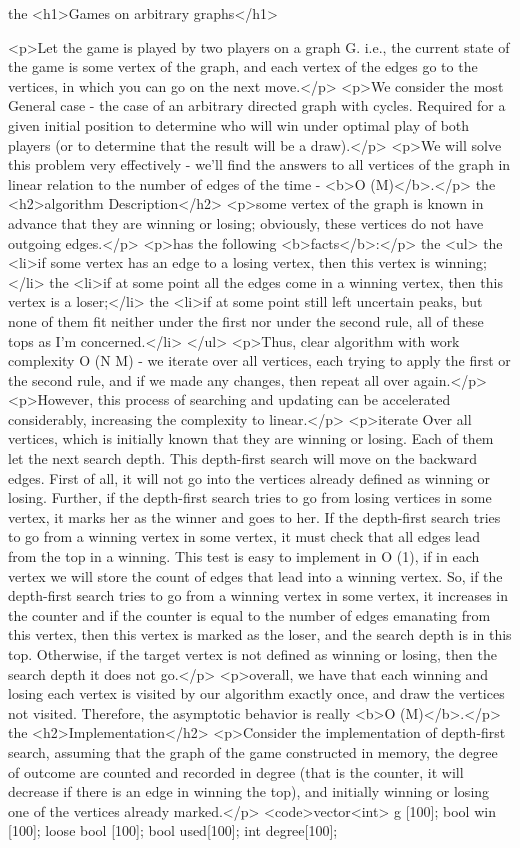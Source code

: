 the <h1>Games on arbitrary graphs</h1>

<p>Let the game is played by two players on a graph G. i.e., the current state of the game is some vertex of the graph, and each vertex of the edges go to the vertices, in which you can go on the next move.</p>
<p>We consider the most General case - the case of an arbitrary directed graph with cycles. Required for a given initial position to determine who will win under optimal play of both players (or to determine that the result will be a draw).</p>
<p>We will solve this problem very effectively - we'll find the answers to all vertices of the graph in linear relation to the number of edges of the time - <b>O (M)</b>.</p>
the <h2>algorithm Description</h2>
<p>some vertex of the graph is known in advance that they are winning or losing; obviously, these vertices do not have outgoing edges.</p>
<p>has the following <b>facts</b>:</p>
the <ul>
the <li>if some vertex has an edge to a losing vertex, then this vertex is winning;</li>
the <li>if at some point all the edges come in a winning vertex, then this vertex is a loser;</li>
the <li>if at some point still left uncertain peaks, but none of them fit neither under the first nor under the second rule, all of these tops as I'm concerned.</li>
</ul>
<p>Thus, clear algorithm with work complexity O (N M) - we iterate over all vertices, each trying to apply the first or the second rule, and if we made any changes, then repeat all over again.</p>
<p>However, this process of searching and updating can be accelerated considerably, increasing the complexity to linear.</p>
<p>iterate Over all vertices, which is initially known that they are winning or losing. Each of them let the next search depth. This depth-first search will move on the backward edges. First of all, it will not go into the vertices already defined as winning or losing. Further, if the depth-first search tries to go from losing vertices in some vertex, it marks her as the winner and goes to her. If the depth-first search tries to go from a winning vertex in some vertex, it must check that all edges lead from the top in a winning. This test is easy to implement in O (1), if in each vertex we will store the count of edges that lead into a winning vertex. So, if the depth-first search tries to go from a winning vertex in some vertex, it increases in the counter and if the counter is equal to the number of edges emanating from this vertex, then this vertex is marked as the loser, and the search depth is in this top. Otherwise, if the target vertex is not defined as winning or losing, then the search depth it does not go.</p>
<p>overall, we have that each winning and losing each vertex is visited by our algorithm exactly once, and draw the vertices not visited. Therefore, the asymptotic behavior is really <b>O (M)</b>.</p>
the <h2>Implementation</h2>
<p>Consider the implementation of depth-first search, assuming that the graph of the game constructed in memory, the degree of outcome are counted and recorded in degree (that is the counter, it will decrease if there is an edge in winning the top), and initially winning or losing one of the vertices already marked.</p>
<code>vector<int> g [100];
bool win [100];
loose bool [100];
bool used[100];
int degree[100];

